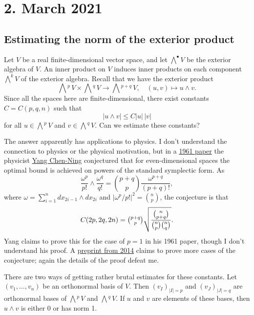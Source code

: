 \documentclass[11pt]{article}
\theoremstyle{definition}
\newcommand{\ext}[1]{\bigwedge{}^{\!\!#1}\,}
\begin{document}
\section*{2. March 2021}
\subsection*{Estimating the norm of the exterior product}

Let \(V\) be a real finite-dimensional vector space, and let \(\bigwedge^\bullet V\) be the exterior algebra of \(V\).
An inner product on \(V\) induces inner products on each component \(\bigwedge^k V\) of the exterior algebra.
Recall that we have the exterior product
\[
\ext{p} V \times \ext{q} V \to \ext{p+q} V,
\quad
(u, v) \mapsto u \wedge v.
\]
Since all the spaces here are finite-dimensional, there exist constants \(C = C(p,q,n)\) such that
\[
|u \wedge v| \leq C |u| \, |v|
\]
for all \(u \in \ext p V\) and \(v \in \ext q V\). Can we estimate these constants?

The answer apparently has applications to physics.
I don't understand the connection to physics or the physical motivation, but in a \href{https://aip.scitation.org/doi/10.1063/1.1703969}{1961 paper} the physicist \href{https://en.wikipedia.org/wiki/Yang_Chen-Ning}{Yang Chen-Ning} conjectured that for even-dimensional spaces the optimal bound is achieved on powers of the standard symplectic form.
As
\[
\frac{\omega^p}{p!} \wedge \frac{\omega^q}{q!} = \binom{p+q}p \frac{\omega^{p+q}}{(p+q)!},
\]
where \(\omega = \sum_{i=1}^n dx_{2i-1} \wedge dx_{2i}\) and \(|\omega^p / p!|^2 = \binom np\), the conjecture is that
\[
C(2p,2q,2n) = \tbinom{p+q}p\sqrt{\frac{\binom{n}{p+q}}{\binom np \binom nq}}.
\]
Yang claims to prove this for the case of \(p = 1\) in his 1961 paper, though I don't understand his proof.
A \href{https://arxiv.org/abs/1409.3931}{preprint from 2014} claims to prove more cases of the conjecture; again the details of the proof defeat me.

There are two ways of getting rather brutal estimates for these constants.
Let \((v_1, \ldots, v_n)\) be an orthonormal basis of \(V\).
Then \((v_I)_{|I| = p}\) and \((v_J)_{|J|=q}\) are orthonormal bases of \(\ext p V\) and \(\ext q V\).
If \(u\) and \(v\) are elements of these bases, then \(u \wedge v\) is either 0 or has norm 1.
\end{document}
